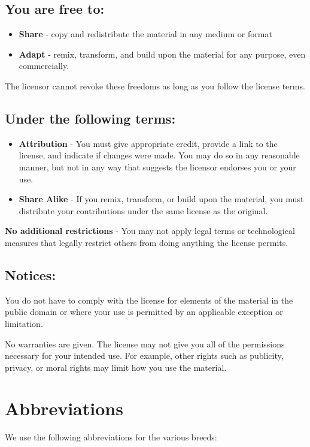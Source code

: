 \documentclass[a4paper,11pt]{report}
\begin{document}
	\subsection*{You are free to:}
	\begin{itemize}
		\item \textbf{Share} - copy and redistribute the material in any medium or format
		\item \textbf{Adapt} - remix, transform, and build upon the material for any purpose, even commercially.
	\end{itemize}
	The licensor cannot revoke these freedoms as long as you follow the license terms.\\ 
	\subsection*{Under the following terms:}
	\begin{itemize}
		\item \textbf{Attribution} - You must give appropriate credit, provide a link to the license, and indicate if changes were made. You may do so in any reasonable manner, but not in any way that suggests the licensor endorses you or your use.
		\item \textbf{Share Alike} - If you remix, transform, or build upon the material, you must distribute your contributions under the same license as the original.
	\end{itemize}
	\textbf{No additional restrictions} - You may not apply legal terms or technological measures that legally restrict others from doing anything the license permits.
	\subsection*{Notices:}
	You do not have to comply with the license for elements of the material in the public domain or where your use is permitted by an applicable exception or limitation.
	
	No warranties are given. The license may not give you all of the permissions necessary for your intended use. For example, other rights such as publicity, privacy, or moral rights may limit how you use the material.

\newpage

	\section*{Abbreviations}
	We use the following abbreviations for the various breeds:
\end{document}
